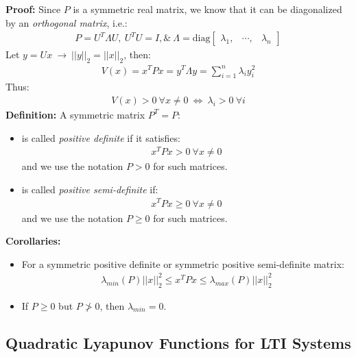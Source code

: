\documentclass[twoside, 11pt]{article}
\begin{document}
\textbf{Proof:} Since $P$ is a symmetric real matrix, we know that it can be diagonalized by an
\textit{orthogonal matrix}, i.e.:
%
\begin{align*}
P = U^T \Lambda U , \ U^T U = I , \& \ \Lambda = 
\mathrm{diag}\begin{bmatrix} \lambda_1 , & \cdots , & \lambda_n  \end{bmatrix}
\end{align*}
%
Let $y = U x \ \rightarrow \ || y ||_2 = || x ||_2$, then:
%
\begin{align*}
V(x) = x^T P x  = y^T \Lambda y = \sum\limits_{i=1}^n \lambda_i y_i^2 
\end{align*}
%
Thus:
%
\begin{align*}
V(x) > 0 \ \forall x \neq 0 \ \iff \ \lambda_i > 0 \ \forall i 
\end{align*}
%
\textbf{Definition:} A symmetric matrix $P^T = P$:
\begin{itemize}
    \item is called \textit{positive definite} if it satisfies:
%
\begin{align*}
x^T P x > 0 \ \forall x \neq 0
\end{align*}
%
and we use the notation $P > 0$ for such matrices.
%
\item is called \textit{positive semi-definite} if:
%
\begin{align*}
x^T P x \geq 0 \ \forall x \neq 0
\end{align*}
%
and we use the notation $P \geq 0$ for such matrices.
\end{itemize}

\textbf{Corollaries:} 
\begin{itemize}
\item For a symmetric positive definite or symmetric positive semi-definite matrix:
%
\begin{align*}
 \lambda_{min}(P) || x ||_2^2 \leq x^T P x \leq \lambda_{max}(P) || x ||_2^2
\end{align*}
%
\item If $P \geq 0$ but $P \not> 0$, then $\lambda_{min} = 0$. 
\end{itemize}

\subsection{Quadratic Lyapunov Functions for LTI Systems}
\end{document}
